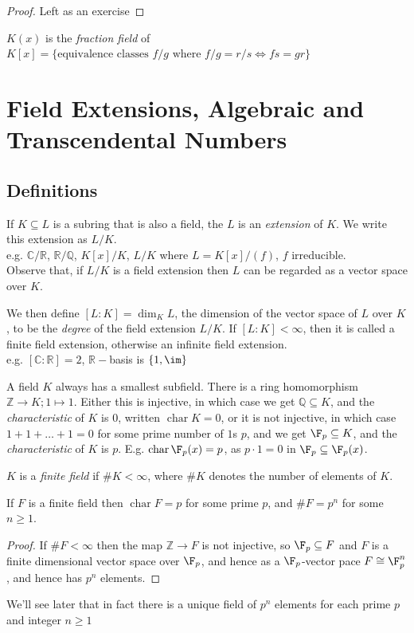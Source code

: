 \documentclass[a4paper, 10pt, twocolumn]{amsart}
\renewcommand{\charr}{\operatorname{char}}
\begin{document}
\begin{proof}
Left as an exercise
\end{proof}

$K(x)$ is the \emph{fraction field} of $K[x] = \{\text{equivalence classes } f/g \text{ where } f/g=r/s \iff fs=gr\}$

\section{Field Extensions, Algebraic and Transcendental Numbers}
\subsection{Definitions}
If $K \subseteq L$ is a subring that is also a field, the $L$ is an \emph{extension} of $K$. We write this extension as $L/K$.\\
e.g. $\mathbb{C}/\mathbb{R}$, $\mathbb{R}/\mathbb{Q}$, $K[x]/K$, $L/K$ where $L = K[x]/(f)$, $f$ irreducible.\\
Observe that, if $L/K$ is a field extension then $L$ can be regarded as a vector space over $K$.

We then define $[L:K] = \dim_K L$, the dimension of the vector space of $L$ over $K$, to be the \emph{degree} of the field extension $L/K$. If $[L:K] < \infty$, then it is called a finite field extension, otherwise an infinite field extension.\\
e.g. $[\mathbb{C}:\mathbb{R}] = 2$, $\mathbb{R}-$basis is $\{1, \im\}$

A field $K$ always has a smallest subfield. There is a ring homomorphism $\mathbb{Z} \rightarrow K; 1 \mapsto 1$. Either this is injective, in which case we get $\mathbb{Q} \subseteq K$, and the \emph{characteristic} of $K$ is $0$, written $\charr K = 0$, or it is not injective, in which case $1+1+\ldots+1 = 0$ for some prime number of $1$s $p$, and we get $\F_p \subseteq K$, and the \emph{characteristic} of $K$ is $p$. E.g. $\charr \F_p(x) = p$, as $p\cdot 1 = 0$ in $\F_p \subseteq \F_p(x)$.

$K$ is a \emph{finite field} if $\#K < \infty$, where $\#K$ denotes the number of elements of $K$.

\begin{lemma}
If $F$ is a finite field then $\charr F = p$ for some prime $p$, and $\#F = p^n$ for some $n \geq 1$.
\end{lemma}
\begin{proof}
If $\#F < \infty$ then the map $\mathbb{Z} \rightarrow F$ is not injective, so $\F_p \subseteq F$ and $F$ is a finite dimensional vector space over $\F_p$, and hence as a $\F_p$-vector pace $F\cong \F_p^n$, and hence has $p^n$ elements.
\end{proof}
We'll see later that in fact there is a unique field of $p^n$ elements for each prime $p$ and integer $n\geq 1$
\end{document}
